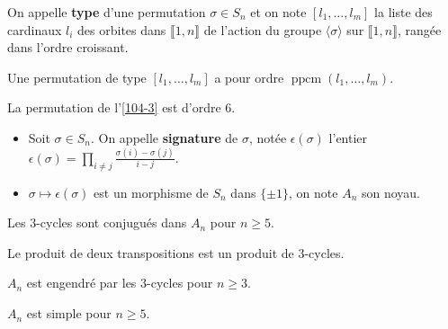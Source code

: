 	\begin{definition}
		On appelle \textbf{type} d'une permutation $\sigma \in S_n$ et on note $[l_1, \dots, l_m]$ la liste des cardinaux $l_i$ des orbites dans $\llbracket 1, n \rrbracket$ de l'action du groupe $\langle \sigma \rangle$ sur $\llbracket 1, n \rrbracket$, rangée dans l'ordre croissant.
	\end{definition}

	\begin{proposition}
		Une permutation de type $[l_1, \dots, l_m]$ a pour ordre $\operatorname{ppcm}(l_1, \dots, l_m)$.
	\end{proposition}

	\begin{example}
		La permutation de l'\cref{104-3} est d'ordre $6$.
	\end{example}

	\begin{definition}
		\begin{itemize}
			\item Soit $\sigma \in S_n$. On appelle \textbf{signature} de $\sigma$, notée $\epsilon(\sigma)$ l'entier $\epsilon(\sigma) = \prod_{i \neq j} \frac{\sigma(i) - \sigma(j)}{i-j}$.
			\item $\sigma \mapsto \epsilon(\sigma)$ est un morphisme de $S_n$ dans $\{ \pm 1 \}$, on note $A_n$ son noyau.
		\end{itemize}
	\end{definition}


  \begin{lemma}
    Les $3$-cycles sont conjugués dans $A_n$ pour $n \geq 5$.
  \end{lemma}


  \begin{lemma}
    Le produit de deux transpositions est un produit de $3$-cycles.
  \end{lemma}

  \begin{proposition}
    $A_n$ est engendré par les $3$-cycles pour $n \geq 3$.
  \end{proposition}


  \begin{theorem}
    $A_n$ est simple pour $n \geq 5$.
  \end{theorem}

